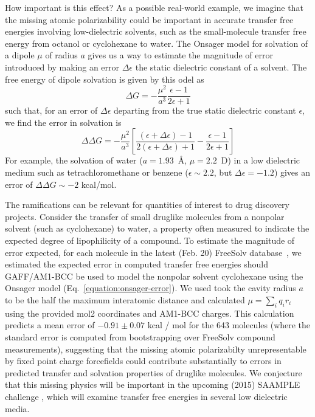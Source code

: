 \documentclass[aps,pre,twocolumn,nofootinbib,superscriptaddress,linenumbers]{revtex4-1}
\begin{document}
How important is this effect?
As a possible real-world example, we imagine that the missing atomic polarizability could be important in accurate transfer free energies involving low-dielectric solvents, such as the small-molecule transfer free energy from octanol or cyclohexane to water.  
The Onsager model for solvation of a dipole $\mu$ of radius $a$ gives us a way to estimate the magnitude of error introduced by making an error $\Delta \epsilon$ the static dielectric constant of a solvent.
The free energy of dipole solvation is given by this odel as
\begin{equation} \label{eq:onsager}
\Delta G = -\frac{\mu^2}{a^3}\frac{\epsilon - 1}{2 \epsilon + 1}
\end{equation}
such that, for an error of $\Delta \epsilon$ departing from the true static dielectric constant $\epsilon$, we find the error in solvation is
\begin{equation} \label{equation:onsager-error}
\Delta \Delta G = -\frac{\mu^2}{a^3} \left[ \frac{(\epsilon+\Delta \epsilon) - 1}{2 (\epsilon+\Delta \epsilon) + 1} - \frac{\epsilon - 1}{2 \epsilon + 1} \right] 
\end{equation}
For example, the solvation of water ($a = 1.93$~\AA, $\mu = 2.2$~D) in a low dielectric medium such as tetrachloromethane or benzene ($\epsilon \sim 2.2$, but $\Delta \epsilon = -1.2$) gives an error of $\Delta \Delta G \sim -2$ kcal/mol.

The ramifications can be relevant for quantities of interest to drug discovery projects.
Consider the transfer of small druglike molecules from a nonpolar solvent (such as cyclohexane) to water, a property often measured to indicate the expected degree of lipophilicity of a compound.
To estimate the magnitude of error expected, for each molecule in the latest (Feb. 20) FreeSolv database~\cite{freesolv, freesolv_github}, we estimated the expected error in computed transfer free energies should GAFF/AM1-BCC be used to model the nonpolar solvent cyclohexane using the Onsager model (Eq.~\ref{equation:onsager-error}).
We used took the cavity radius $a$ to be the half the maximum interatomic distance and calculated $\mu = \sum_i q_i r_i$ using the provided mol2 coordinates and AM1-BCC charges.  
This calculation predicts a mean error of $-0.91 \pm0.07$ kcal / mol for the 643 molecules (where the standard error is computed from bootstrapping over FreeSolv compound measurements), 
suggesting that the missing atomic polarizabilty unrepresentable by fixed point charge forcefields could contribute substantially to errors in predicted transfer and solvation properties of druglike molecules.  
We conjecture that this missing physics will be important in the upcoming (2015) SAAMPLE challenge \cite{newman2009practical}, which will examine transfer free energies in several low dielectric media. 
\end{document}
